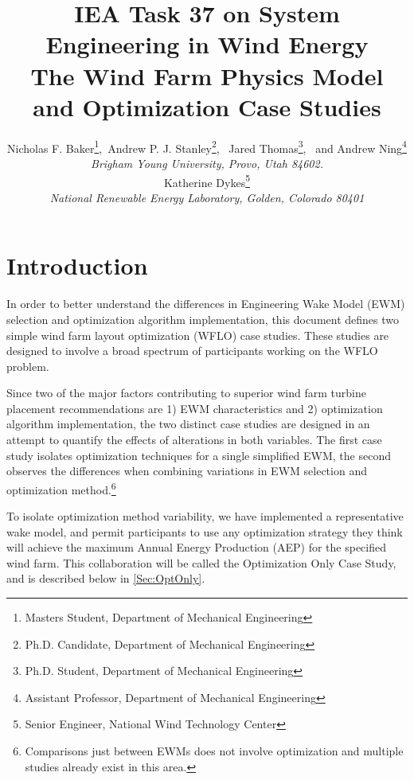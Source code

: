 \documentclass[12pt]{article}
\begin{document}
\title{IEA Task 37 on System Engineering in Wind Energy \\
\large The Wind Farm Physics Model and Optimization Case Studies}
\author{Nicholas F. Baker\thanks{Masters Student, Department of Mechanical Engineering},\  Andrew P. J. Stanley\thanks{Ph.D. Candidate, Department of Mechanical Engineering}, \ Jared Thomas\thanks{Ph.D. Student, Department of Mechanical Engineering}, \ and Andrew Ning\thanks{Assistant Professor, Department of Mechanical Engineering} \\
    {\normalsize\itshape Brigham Young University, Provo, Utah 84602.}\\
Katherine Dykes\thanks{Senior Engineer, National Wind Technology Center}\\
   \normalsize\itshape National Renewable Energy Laboratory, Golden, Colorado 80401}
\date{\vspace{-5ex}}

\maketitle{}
\vspace{-0.5cm}
\tableofcontents

\section{Introduction}

In order to better understand the differences in Engineering Wake Model (EWM) selection and optimization algorithm implementation, this document defines two simple wind farm layout optimization (WFLO) case studies. These studies are designed to involve a broad spectrum of participants working on the WFLO problem.
    
    Since two of the major factors contributing to superior wind farm turbine placement recommendations are 1) EWM characteristics and 2) optimization algorithm implementation, the two distinct case studies are designed in an attempt to quantify the effects of alterations in both variables. The first case study isolates optimization techniques for a single simplified EWM, the second observes the differences when combining variations in EWM selection and optimization method.\footnote{Comparisons just between EWMs does not involve optimization and multiple studies already exist in this area.}
    
    To isolate optimization method variability, we have implemented a representative wake model, and permit participants to use any optimization strategy they think will achieve the maximum Annual Energy Production (AEP) for the specified wind farm. This collaboration will be called the Optimization Only Case Study, and is described below in \cref{Sec:OptOnly}.
    
\end{document}
